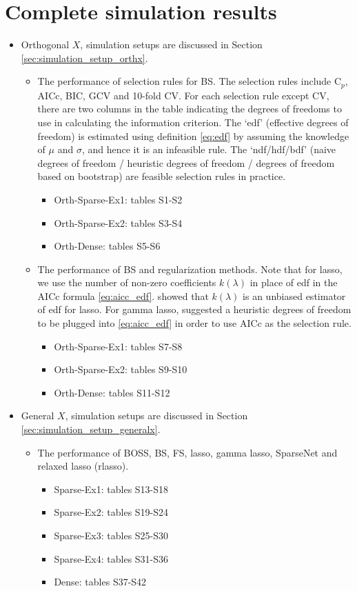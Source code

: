 \section{Complete simulation results}
\begin{itemize}
	\item Orthogonal $X$, simulation setups are discussed in Section \ref{sec:simulation_setup_orthx}. 
	\begin{itemize}
		\item The performance of selection rules for BS. The selection rules include C$_p$, AICc, BIC, GCV and 10-fold CV. For each selection rule except CV, there are two columns in the table indicating the degrees of freedoms to use in calculating the information criterion. The `edf' (effective degrees of freedom) is estimated using definition \eqref{eq:edf} by assuming the knowledge of $\mu$ and $\sigma$, and hence it is an infeasible rule. The `ndf/hdf/bdf' (naive degrees of freedom /  heuristic degrees of freedom / degrees of freedom based on bootstrap) are feasible selection rules in practice. 
		\begin{itemize}
			\item Orth-Sparse-Ex1: tables S1-S2
			\item Orth-Sparse-Ex2: tables S3-S4
			\item Orth-Dense: tables S5-S6
		\end{itemize}
		\item The performance of BS and regularization methods. Note that for lasso, we use the number of non-zero coefficients $k(\lambda)$ in place of edf in the AICc formula \eqref{eq:aicc_edf}.  showed that $k(\lambda)$ is an unbiased estimator of edf for lasso. For gamma lasso,  suggested a heuristic degrees of freedom to be plugged into \eqref{eq:aicc_edf} in order to use AICc as the selection rule.
		\begin{itemize}
			\item Orth-Sparse-Ex1: tables S7-S8
			\item Orth-Sparse-Ex2: tables S9-S10
			\item Orth-Dense: tables S11-S12
		\end{itemize}
	\end{itemize}
	\item General $X$, simulation setups are discussed in Section \ref{sec:simulation_setup_generalx}. 
	\begin{itemize}
		\item The performance of BOSS, BS, FS, lasso, gamma lasso, SparseNet and relaxed lasso (rlasso).
		\begin{itemize}
			\item Sparse-Ex1: tables S13-S18
			\item Sparse-Ex2: tables S19-S24
			\item Sparse-Ex3: tables S25-S30
			\item Sparse-Ex4: tables S31-S36
			\item Dense: tables S37-S42
		\end{itemize}
	\end{itemize}
\end{itemize}

